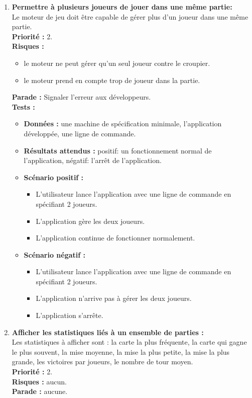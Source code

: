 \documentclass{article}
\begin{document}
\begin{enumerate}
    \item \textbf{Permettre à plusieurs joueurs de jouer dans une même partie:} \\
    Le moteur de jeu doit être capable de gérer plus d'un joueur dans une même partie.\\
    \textbf{Priorité :} 2.\\
    \textbf{Risques :} 
    \begin{itemize}
        \item le moteur ne peut gérer qu'un seul joueur contre le croupier.
        \item le moteur prend en compte trop de joueur dans la partie.
    \end{itemize}
    \textbf{Parade :} Signaler l'erreur aux développeurs. \\
    \textbf{Tests :}
    \begin{itemize}
        \item \textbf{Données :} une machine de spécification minimale, l'application développée, une ligne de commande.
        \item \textbf{Résultats attendus :} positif: un fonctionnement normal de l'application, négatif: l'arrêt de l'application.
        \item \textbf{Scénario positif :}
        \begin{itemize}
            \item L'utilisateur lance l'application avec une ligne de commande en spécifiant 2 joueurs.
            \item L'application gère les deux joueurs.
            \item L'application continue de fonctionner normalement.
        \end{itemize}
        \item \textbf{Scénario négatif :}
        \begin{itemize}
            \item L'utilisateur lance l'application avec une ligne de commande en spécifiant 2 joueurs.
            \item L'application n'arrive pas à gérer les deux joueurs.
            \item L'application s'arrête.
        \end{itemize}
    \end{itemize}
    
    \item \textbf{Afficher les statistiques liés à un ensemble de parties :} \\
    Les statistiques à afficher sont : la carte la plus fréquente, la carte qui gagne le plus souvent, la mise moyenne, la mise la plus petite, la mise la plus grande, les victoires par joueurs, le nombre de tour moyen. \\
    \textbf{Priorité :} 2. \\
    \textbf{Risques :} aucun. \\
    \textbf{Parade :} aucune.
    
\end{enumerate}
\end{document}
